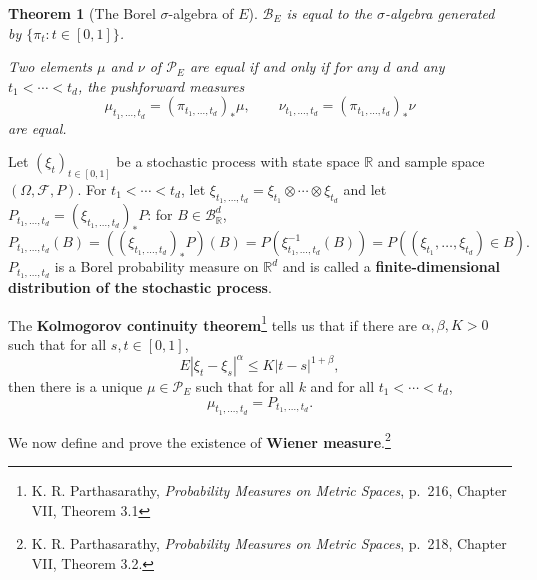 \documentclass{article}
\newtheorem{theorem}{Theorem}
\theoremstyle{definition}
\begin{document}
\begin{theorem}[The Borel $\sigma$-algebra of $E$]
$\mathscr{B}_E$ is equal to the $\sigma$-algebra generated by $\{\pi_t: t \in [0,1]\}$.

Two elements $\mu$ and $\nu$ of $\mathscr{P}_E$ are equal if and only if for any $d$ and any $t_1<\cdots<t_d$, the pushforward measures
\[
\mu_{t_1,\ldots,t_d} = (\pi_{t_1,\ldots,t_d})_* \mu,\qquad
\nu_{t_1,\ldots,t_d} =  (\pi_{t_1,\ldots,t_d})_* \nu
\]
are equal.
\label{theorem21}
\end{theorem}



Let $(\xi_t)_{t \in [0,1]}$ be a stochastic process with state space $\mathbb{R}$ and sample space
$(\Omega,\mathscr{F},P)$. 
For $t_1<\cdots<t_d$,
let $\xi_{t_1,\ldots,t_d} = \xi_{t_1} \otimes \cdots \otimes \xi_{t_d}$ and
let $P_{t_1,\ldots,t_d} = (\xi_{t_1,\ldots,t_d})_*P$: for $B \in \mathscr{B}_{\mathbb{R}}^d$,  
\[
P_{t_1,\ldots,t_d}(B) = ((\xi_{t_1,\ldots,t_d})_*P)(B) = P(\xi_{t_1,\ldots,t_d}^{-1}(B))
=P((\xi_{t_1},\ldots,\xi_{t_d}) \in B).
\]
$P_{t_1,\ldots,t_d}$ is a Borel probability measure on $\mathbb{R}^d$ and is called a \textbf{finite-dimensional distribution
of the stochastic process}.

The \textbf{Kolmogorov continuity theorem}\footnote{K. R.
Parthasarathy, {\em Probability Measures on Metric Spaces}, p.~216, Chapter VII, Theorem 3.1}
tells us that if there are $\alpha,\beta,K>0$ 
such that  for all $s,t \in [0,1]$,
\[
E |\xi_t - \xi_s|^\alpha \leq K |t-s|^{1+\beta},
\]
then there is a unique $\mu \in \mathscr{P}_E$ such that for all $k$ and for all $t_1<\cdots<t_d$,
\[
\mu_{t_1,\ldots,t_d} = P_{t_1,\ldots,t_d}.
\]

We now define and prove the existence of \textbf{Wiener measure}.\footnote{K. R.
Parthasarathy, {\em Probability Measures on Metric Spaces}, p.~218, Chapter VII, Theorem 3.2.}
\end{document}
